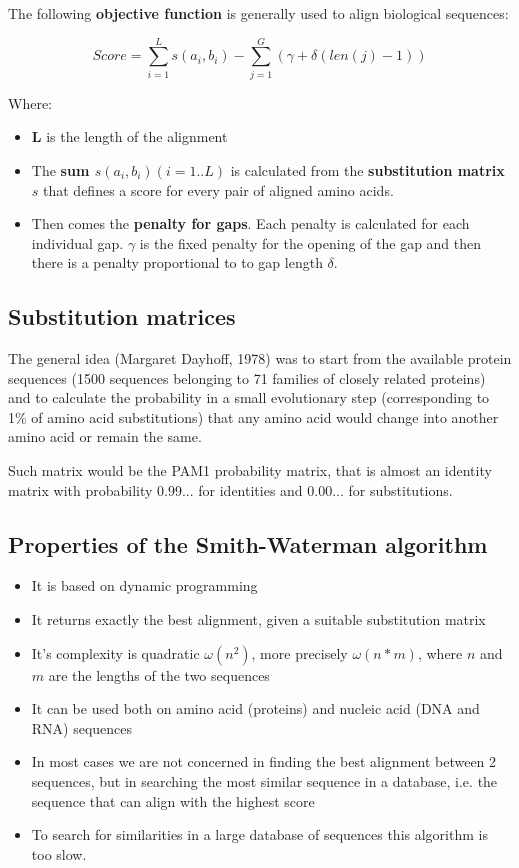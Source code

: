 The following \textbf{objective function} is generally used to align biological
sequences:

\begin{equation}
Score = \sum_{i=1}^{L} s(a_i,b_i) - \sum_{j=1}^{G} (\gamma + \delta(len(j)-1))
\end{equation}

Where:
\begin{itemize}
  \item \textbf{L} is the length of the alignment
  \item The \textbf{sum $s(a_i,b_i) (i=1..L) $} is calculated from the
\textbf{substitution matrix} $s$ that defines a score for every pair of aligned
amino acids.
  \item Then comes the \textbf{penalty for gaps}. Each penalty is calculated
 for each individual gap. \textbf{$\gamma$} is the fixed penalty for the
 opening of the gap and then there is a penalty proportional to to gap length
\textbf{$\delta$}.
\end{itemize}

\subsection{Substitution matrices}

The general idea (Margaret Dayhoff, 1978) was to start from the available
protein sequences (1500 sequences belonging to 71 families of closely related
proteins) and to calculate the probability in a small evolutionary step
(corresponding to 1\% of amino acid substitutions) that any amino acid would
change into another amino acid or remain the same.

Such matrix would be the PAM1 probability matrix, that is almost an identity
matrix with probability 0.99... for identities and 0.00... for substitutions.

\subsection{Properties of the Smith-Waterman algorithm}

\begin{itemize}
  \item It is based on dynamic programming
  \item It returns exactly the best alignment, given a suitable substitution
 matrix
  \item It's complexity is quadratic $\omega(n^2)$, more precisely
$\omega(n*m)$, where $n$ and $m$ are the lengths of the two sequences
  \item It can be used both on amino acid (proteins) and nucleic acid (DNA and
RNA) sequences
  \item In most cases we are not concerned in finding the best alignment
between 2 sequences, but in searching the most similar sequence in a database,
i.e. the sequence that can align with the highest score
  \item To search for similarities in a large database of sequences this
algorithm is too slow.
\end{itemize}
